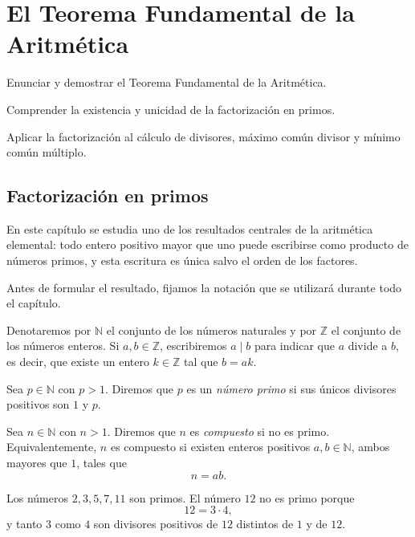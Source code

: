 \chapter{El Teorema Fundamental de la Aritmética}

\begin{objetivos}
  \item Enunciar y demostrar el Teorema Fundamental de la Aritmética.
  \item Comprender la existencia y unicidad de la factorización en primos.
  \item Aplicar la factorización al cálculo de divisores, máximo común divisor y mínimo común múltiplo.
\end{objetivos}

\section{Factorización en primos}

En este capítulo se estudia uno de los resultados centrales de la aritmética elemental: todo entero positivo mayor que uno puede escribirse como producto de números primos, y esta escritura es única salvo el orden de los factores.

Antes de formular el resultado, fijamos la notación que se utilizará durante todo el capítulo.

\begin{convencion}
Denotaremos por \(\mathbb{N}\) el conjunto de los números naturales y por \(\mathbb{Z}\) el conjunto de los números enteros. Si \(a,b\in\mathbb{Z}\), escribiremos \(a\mid b\) para indicar que \(a\) divide a \(b\), es decir, que existe un entero \(k\in\mathbb{Z}\) tal que \(b=ak\).
\end{convencion}

\begin{definicion}
Sea \(p\in\mathbb{N}\) con \(p>1\). Diremos que \(p\) es un \emph{número primo} si sus únicos divisores positivos son \(1\) y \(p\).
\end{definicion}

\begin{definicion}
Sea \(n\in\mathbb{N}\) con \(n>1\). Diremos que \(n\) es \emph{compuesto} si no es primo. Equivalentemente, \(n\) es compuesto si existen enteros positivos \(a,b\in\mathbb{N}\), ambos mayores que \(1\), tales que
\[
  n=ab.
\]
\end{definicion}

\begin{ejemplo}
Los números \(2,3,5,7,11\) son primos. El número \(12\) no es primo porque
\[
  12=3\cdot 4,
\]
y tanto \(3\) como \(4\) son divisores positivos de \(12\) distintos de \(1\) y de \(12\).
\end{ejemplo}

